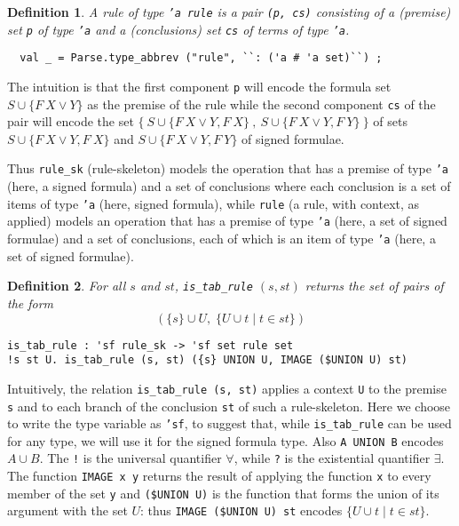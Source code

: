 \documentclass[a4paper]{article}
\newtheorem{definition}{Definition}
\begin{document}
\begin{definition}
  A rule of type \texttt{'a rule} is a pair
  \texttt{(p, cs)}
  consisting of a (premise) set
  \texttt{p}
  of type
  \texttt{'a} and a (conclusions) set
  \texttt{cs}
  of terms of type \texttt{'a}. 
\begin{verbatim}
  val _ = Parse.type_abbrev ("rule", ``: ('a # 'a set)``) ;
\end{verbatim}
\end{definition}

The intuition is that the first component
\texttt{p}
will encode the formula set 
$S \cup \{ F ~ X \lor Y \}$ as the premise of the
rule while 
the second component
\texttt{cs}
of the pair will encode the set 
$\{~S \cup \{F ~ X \lor Y, F~ X\}~ , ~S \cup\{F ~ X \lor Y, F~ Y\}~\}$ 
of sets
$S \cup \{F ~ X \lor Y, F~ X\}$
and
$S \cup \{F ~ X \lor Y, F~ Y\}$
of signed formulae.

Thus \texttt{rule\_sk} (rule-skeleton) models the operation that has 
a premise of type \texttt{'a} (here, a signed formula)
and a set of conclusions
where each conclusion is a set of items of type \texttt{'a} (here,
signed formula), while \texttt{rule} (a rule, with context, as applied) 
models an operation that has a premise
of type \texttt{'a} (here, a set of signed formulae) and a set
of conclusions, each of which is an item of type \texttt{'a} 
(here, a set of signed formulae).

\begin{definition}
  For all $s$ and $st$,
  \texttt{is\_tab\_rule} $(s, st)$
  returns the set of pairs of the form
  $$(\{s\} \cup U, \;\{U \cup t \mid t \in st\})$$
\begin{verbatim}
is_tab_rule : 'sf rule_sk -> 'sf set rule set
!s st U. is_tab_rule (s, st) ({s} UNION U, IMAGE ($UNION U) st) 
\end{verbatim}
\end{definition}

Intuitively, the relation
\texttt{is\_tab\_rule (s, st)} applies a context \texttt{U} to
the premise \texttt{s} and to each branch of the conclusion
\texttt{st} of such a rule-skeleton.
Here we choose to write the type variable as \texttt{'sf}, to suggest that,
while \texttt{is\_tab\_rule} can be used for any type, we will use it
for the signed formula type.
Also \texttt{A UNION B} encodes $A \cup B$.
The \texttt{!} is the universal quantifier $\forall$,
while \texttt{?} is the existential quantifier $\exists$.
The function
\texttt{IMAGE x y}
returns the result of applying the function
\texttt{x}
to every member of the set
\texttt{y} and 
\texttt{(\$UNION U)} is 
the function that forms the union of its argument with the set $U$:
thus 
\texttt{IMAGE (\$UNION U) st} encodes
$\{U \cup t \mid t \in st\}$.
\end{document}
